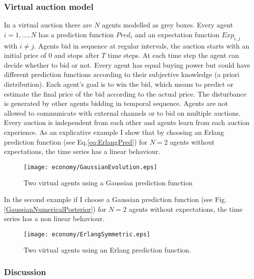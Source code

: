 \subsubsection{Virtual auction model}
In a virtual auction there are $N$ agents modelled as grey boxes.
Every agent $i=1,...,N$ has a prediction function $Pred_{i}$ and an expectation
 function $Exp_{i,j}$ with $i \neq j$.
Agents bid in sequence at regular intervals, the auction starts with an initial
price of 0 and stops after $T$ time steps.
At each time step the agent can decide whether to bid or not.
Every agent has equal buying power but could have different prediction functions
 according to their subjective knowledge (a priori distribution).
Each agent's goal is to win the bid, which means to predict or estimate the final
price of the bid according to the actual price. The disturbance is generated by
 other agents bidding in temporal sequence.
Agents are not allowed to communicate with external channels or to bid on
multiple auctions. Every auction is independent from each other and agents
learn from each auction experience.
As an explicative example I show that by choosing an Erlang prediction function
 (see Eq.\ref{eq:ErlangPred}) for $N=2$ agents without expectations, the time series
has a linear behaviour.
\begin{figure}[!htbp]
	\begin{center}
	\texttt{[image: economy/GaussianEvolution.eps]}
	\end{center}
	\caption[Multi Agent Gaussian]{Two virtual agents using a Gaussian prediction function}
	\label{GaussianAuction}
\end{figure}
In the second example if I choose a Gaussian prediction function
(see Fig.\ref{GaussianNumericalPosterior}) for $N=2$ agents without expectations,
the time series has a non linear behaviour.
\begin{figure}[!htbp]
	\begin{center}
	\texttt{[image: economy/ErlangSymmetric.eps]}
	\end{center}
	\caption[Multi Agent Erlang]{Two virtual agents using an Erlang prediction function.}
	\label{ErlangAuction}
\end{figure}


\subsubsection{Discussion}

